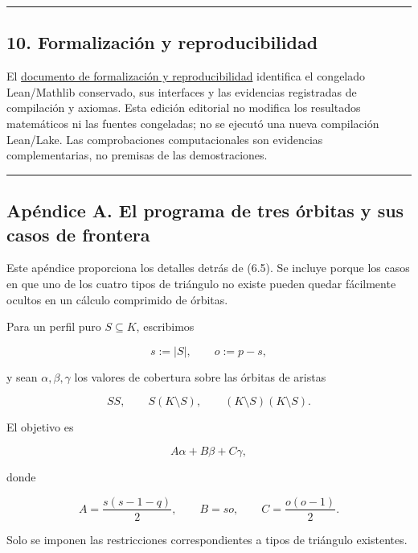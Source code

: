 \documentclass[spanish,11pt,a4paper]{article}
\begin{document}
\begin{center}\rule{0.5\linewidth}{0.5pt}\end{center}

\subsection{10. Formalización y
reproducibilidad}\label{formalizaciuxf3n-y-reproducibilidad}

El
\href{https://github.com/jtraverso/erdos-81-chordal-clique-partitions/blob/main/preprints/PAPER_I/05_formalization/FORMALIZATION_COMPANION_v1.4_es.pdf}{documento
de formalización y reproducibilidad} identifica el congelado
Lean/Mathlib conservado, sus interfaces y las evidencias registradas de
compilación y axiomas. Esta edición editorial no modifica los resultados
matemáticos ni las fuentes congeladas; no se ejecutó una nueva
compilación Lean/Lake. Las comprobaciones computacionales son evidencias
complementarias, no premisas de las demostraciones.

\begin{center}\rule{0.5\linewidth}{0.5pt}\end{center}

\subsection{Apéndice A. El programa de tres órbitas y sus casos de
frontera}\label{apuxe9ndice-a.-el-programa-de-tres-uxf3rbitas-y-sus-casos-de-frontera}

Este apéndice proporciona los detalles detrás de (6.5). Se incluye
porque los casos en que uno de los cuatro tipos de triángulo no existe
pueden quedar fácilmente ocultos en un cálculo comprimido de órbitas.

Para un perfil puro \(S\subseteq K\), escribimos

\[
s:=|S|,
\qquad
o:=p-s,
\]

y sean \(\alpha,\beta,\gamma\) los valores de cobertura sobre las
órbitas de aristas

\[
SS,\qquad S(K\setminus S),\qquad (K\setminus S)(K\setminus S).
\]

El objetivo es

\[
A\alpha+B\beta+C\gamma,
\]

donde

\[
A=\frac{s(s-1-q)}2,
\qquad
B=so,
\qquad
C=\frac{o(o-1)}2.
\]

Solo se imponen las restricciones correspondientes a tipos de triángulo
existentes.
\end{document}

